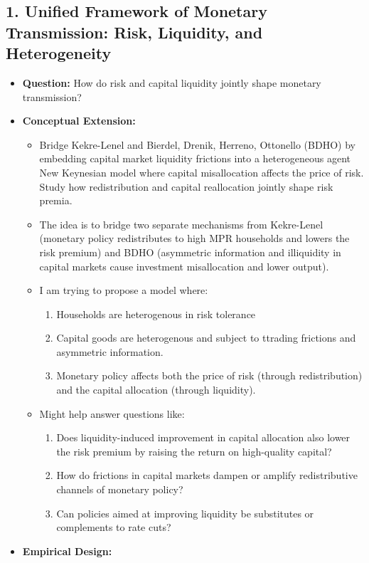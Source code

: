 \documentclass[10pt]{article}
\begin{document}
\subsection*{1. Unified Framework of Monetary Transmission: Risk, Liquidity, and Heterogeneity}
\begin{itemize}
\item \textbf{Question:} How do risk and capital liquidity jointly shape monetary transmission?
\item \textbf{Conceptual Extension:}
\begin{itemize}
\item Bridge Kekre-Lenel and Bierdel, Drenik, Herreno, Ottonello (BDHO) by embedding capital market liquidity frictions into a heterogeneous agent New Keynesian model where capital misallocation affects the price of risk. Study how redistribution and capital reallocation jointly shape risk premia.
\item The idea is to bridge two separate mechanisms from Kekre-Lenel (monetary policy redistributes to high MPR households and lowers the risk premium) and BDHO (asymmetric information and illiquidity in capital markets cause investment misallocation and lower output). 
\item I am trying to propose a model where:
\begin{enumerate}
    \item Households are heterogenous in risk tolerance 
    \item Capital goods are heterogenous and subject to ttrading frictions and asymmetric information. 
    \item Monetary policy affects both the price of risk (through redistribution) and the capital allocation (through liquidity). 
\end{enumerate}
\item Might help answer questions like: 
\begin{enumerate}
    \item Does liquidity-induced improvement in capital allocation also lower the risk premium by raising the return on high-quality capital?
    \item How do frictions in capital markets dampen or amplify redistributive channels of monetary policy?
    \item Can policies aimed at improving liquidity be substitutes or complements to rate cuts? 
\end{enumerate}
\end{itemize}
\item \textbf{Empirical Design:}

\end{itemize}
\end{document}

